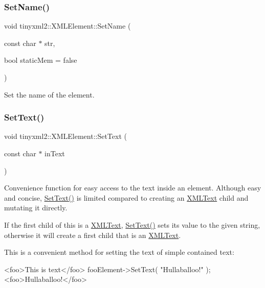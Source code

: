 \subsubsection{\texorpdfstring{Set\+Name()}{SetName()}}
{\footnotesize\ttfamily void tinyxml2\+::\+X\+M\+L\+Element\+::\+Set\+Name (\begin{DoxyParamCaption}\item[{const char $\ast$}]{str,  }\item[{bool}]{static\+Mem = {\ttfamily false} }\end{DoxyParamCaption})\hspace{0.3cm}{\ttfamily [inline]}}



Set the name of the element. 

\mbox{\label{classtinyxml2_1_1_x_m_l_element_a1f9c2cd61b72af5ae708d37b7ad283ce}} 
\subsubsection{\texorpdfstring{Set\+Text()}{SetText()}\hspace{0.1cm}{\footnotesize\ttfamily [1/7]}}
{\footnotesize\ttfamily void tinyxml2\+::\+X\+M\+L\+Element\+::\+Set\+Text (\begin{DoxyParamCaption}\item[{const char $\ast$}]{in\+Text }\end{DoxyParamCaption})}

Convenience function for easy access to the text inside an element. Although easy and concise, \hyperlink{classtinyxml2_1_1_x_m_l_element_a1f9c2cd61b72af5ae708d37b7ad283ce}{Set\+Text()} is limited compared to creating an \hyperlink{classtinyxml2_1_1_x_m_l_text}{X\+M\+L\+Text} child and mutating it directly.

If the first child of \textquotesingle{}this\textquotesingle{} is a \hyperlink{classtinyxml2_1_1_x_m_l_text}{X\+M\+L\+Text}, \hyperlink{classtinyxml2_1_1_x_m_l_element_a1f9c2cd61b72af5ae708d37b7ad283ce}{Set\+Text()} sets its value to the given string, otherwise it will create a first child that is an \hyperlink{classtinyxml2_1_1_x_m_l_text}{X\+M\+L\+Text}.

This is a convenient method for setting the text of simple contained text\+: \begin{DoxyVerb}<foo>This is text</foo>
fooElement->SetText( "Hullaballoo!" );
<foo>Hullaballoo!</foo>
\end{DoxyVerb}



